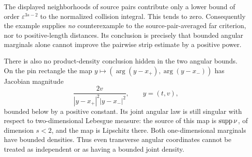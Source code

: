 The displayed neighborhoods of source pairs contribute only a lower
bound of order \(\varepsilon^{3s-2}\) to the normalized collision
integral. This tends to zero. Consequently the example supplies
\emph{no} counterexample to the source-pair-averaged far criterion,
nor to positive-length distances. Its conclusion is precisely that
bounded angular marginals alone cannot improve the pairwise strip
estimate by a positive power.

There is also no product-density conclusion hidden in the two angular
bounds. On the pin rectangle the map
\(y\mapsto(\arg(y-x_+),\arg(y-x_-))\) has Jacobian magnitude
\[
 \frac{2v}{|y-x_+|^2|y-x_-|^2},\qquad y=(t,v),
\]
bounded below by a positive constant. Its joint angular law is still
singular with respect to two-dimensional Lebesgue measure: the source
of this map is \(\operatorname{supp}\nu\), of dimension \(s<2\), and the map
is Lipschitz there. Both one-dimensional marginals have bounded
densities. Thus even transverse angular coordinates cannot be treated
as independent or as having a bounded joint density.
